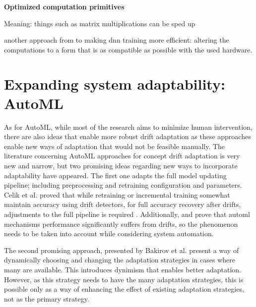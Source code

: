 \textbf{Optimized computation primitives}

Meaning: things such as matrix multiplications can be sped up

another approach from \cite{ben-nunDemystifyingParallelDistributed2019} to making dnn training more efficient: altering the computations to a form that is as compatible as possible with the used hardware.


\section{Expanding system adaptability: AutoML}



As for AutoML, while most of the research aims to minimize human intervention, there are also ideas that enable more robust drift adaptation as these approaches enable new ways of adaptation that would not be feasible manually. The literature concerning AutoML approaches for concept drift adaptation is very new and narrow, but two promising ideas regarding new ways to incorporate adaptability have appeared. The first one adapts the full model updating pipeline; including preprocessing and retraining configuration and parameters. Celik et al. proved that while retraining or incremental training somewhat maintain accuracy using drift detectors, for full accuracy recovery after drifts, adjustments to the full pipeline is required \cite{celikAdaptationStrategiesAutomated2021}. Additionally, \cite{celikAdaptationStrategiesAutomated2021} and \cite{madridAutoMLPresenceDrift2019} prove that automl mechanisms performance significantly suffers from drifts, so the phenomenon needs to be taken into account while considering system automation. 


The second promising approach, presented by Bakirov et al. \cite{bakirovAutomatedAdaptationStrategies2021} present a way of dynamically choosing and changing the adaptation strategies in cases where many are available. This introduces dynimism that enables better adaptation. However, as this strategy needs to have the many adaptation strategies, this is possible only as a way of enhancing the effect of existing adaptation strategies, not as the primary strategy.

